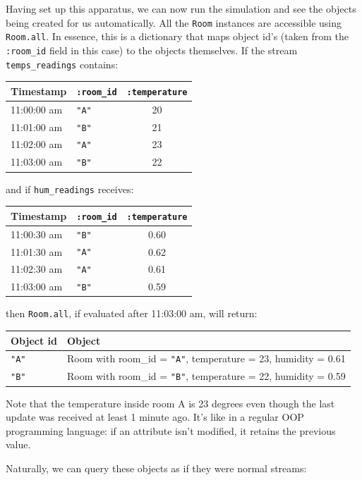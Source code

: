 \documentclass{report}
\begin{document}
Having set up this apparatus, we can now run the simulation and see
the objects being created for us automatically. All the \verb=Room=
instances are accessible using \verb=Room.all=. In essence, this is a
dictionary that maps object id's (taken from the \verb=:room_id= field
in this case) to the objects themselves. If the stream
\verb=temps_readings= contains:

\begin{tabular}{ |l|l|c| }
  \hline
  Timestamp & \verb=:room_id= & \verb=:temperature= \\
  \hline
  11:00:00 am & \verb="A"= & 20 \\
  11:01:00 am & \verb="B"= & 21 \\
  11:02:00 am & \verb="A"= & 23 \\
  11:03:00 am & \verb="B"= & 22 \\
  \hline
\end{tabular}

and if \verb=hum_readings= receives:

\begin{tabular}{ |l|l|c| }
  \hline
  Timestamp & \verb=:room_id= & \verb=:temperature= \\
  \hline
  11:00:30 am & \verb="B"= & 0.60 \\
  11:01:30 am & \verb="A"= & 0.62 \\
  11:02:30 am & \verb="A"= & 0.61 \\
  11:03:00 am & \verb="B"= & 0.59 \\
  \hline
\end{tabular}

then \verb=Room.all=, if evaluated after 11:03:00 am, will return:

\begin{tabular}{ |l|l| }
  \hline
  Object id & Object \\
  \hline
  \verb="A"= & Room with room\_id = \verb="A"=, temperature = 23, humidity = 0.61 \\
  \verb="B"= & Room with room\_id = \verb="B"=, temperature = 22, humidity = 0.59 \\
  \hline
\end{tabular}

Note that the temperature inside room A is 23 degrees even though the
last update was received at least 1 minute ago. It's like in a regular
OOP programming language: if an attribute isn't modified, it retains
the previous value.

Naturally, we can query these objects as if they were normal streams:
\end{document}
